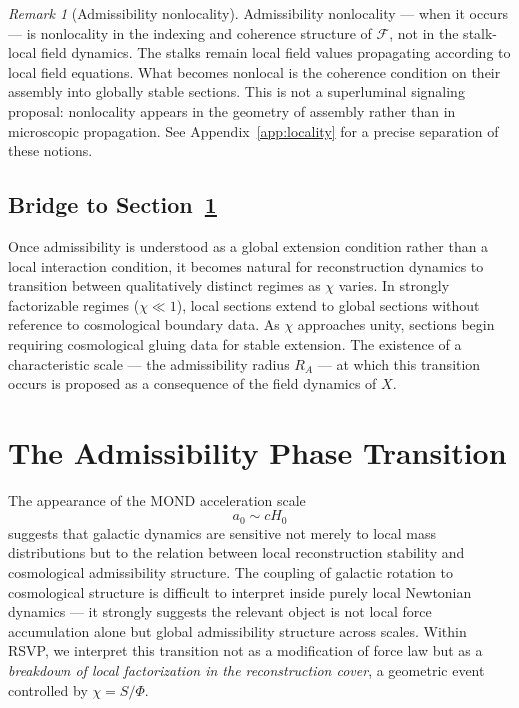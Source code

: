 \documentclass[11pt, a4paper]{article}
\theoremstyle{plain}
\theoremstyle{definition}
\theoremstyle{remark}
\newtheorem{remark}[theorem]{Remark}
\newcommand{\RA}{R_{\!A}}
\newcommand{\sheaf}{\mathcal{F}}
\begin{document}
\begin{remark}[Admissibility nonlocality]
\label{rem:nonlocal}
Admissibility nonlocality --- when it occurs --- is nonlocality in the indexing and
coherence structure of $\sheaf$, not in the stalk-local field dynamics. The stalks
remain local field values propagating according to local field equations. What becomes
nonlocal is the coherence condition on their assembly into globally stable sections.
This is not a superluminal signaling proposal: nonlocality appears in the geometry of
assembly rather than in microscopic propagation. See Appendix~\ref{app:locality} for
a precise separation of these notions.
\end{remark}

\subsection{Bridge to Section~\ref{sec:transition}}

Once admissibility is understood as a global extension condition rather than a local
interaction condition, it becomes natural for reconstruction dynamics to transition
between qualitatively distinct regimes as $\chi$ varies. In strongly factorizable
regimes ($\chi \ll 1$), local sections extend to global sections without reference to
cosmological boundary data. As $\chi$ approaches unity, sections begin requiring
cosmological gluing data for stable extension. The existence of a characteristic
scale --- the admissibility radius $\RA$ --- at which this transition occurs is
proposed as a consequence of the field dynamics of $X$.

\section{The Admissibility Phase Transition}
\label{sec:transition}

The appearance of the MOND acceleration scale \cite{milgrom1983,mcgaugh2011}
\begin{equation}
  a_0 \sim cH_0
\end{equation}
suggests that galactic dynamics are sensitive not merely to local mass distributions
but to the relation between local reconstruction stability and cosmological
admissibility structure. The coupling of galactic rotation to cosmological structure
is difficult to interpret inside purely local Newtonian dynamics --- it strongly
suggests the relevant object is not local force accumulation alone but global
admissibility structure across scales. Within RSVP, we interpret this transition not
as a modification of force law but as a \emph{breakdown of local factorization in the
reconstruction cover}, a geometric event controlled by $\chi = S/\Phi$.
\end{document}
